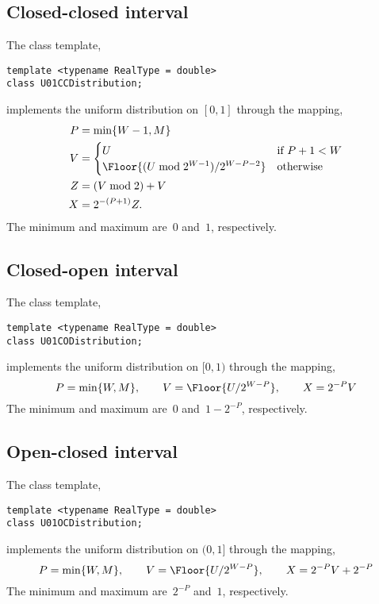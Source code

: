 \subsection{Closed-closed interval}
\label{sub:Closed-closed interval}

The class template,
\begin{verbatim}
template <typename RealType = double>
class U01CCDistribution;
\end{verbatim}
implements the uniform distribution on $[0, 1]$ through the mapping,
\begin{align*}
  P &= \min\{W - 1, M\} \\
  V &= \begin{cases}
    U &\text{if } P + 1 < W \\
    \Floor{(U \bmod 2^{W - 1}) / 2^{W - P -2}} &\text{otherwise}
  \end{cases} \\
  Z &= (V \bmod 2) + V \\
  X &= 2^{-(P + 1)} Z.
\end{align*}
The minimum and maximum are~$0$ and~$1$, respectively.

\subsection{Closed-open interval}
\label{sub:Closed-open interval}

The class template,
\begin{verbatim}
template <typename RealType = double>
class U01CODistribution;
\end{verbatim}
implements the uniform distribution on $[0, 1)$ through the mapping,
\begin{equation*}
  P = \min\{W, M\},\qquad
  V = \Floor{U / 2^{W - P}},\qquad
  X = 2^{-P} V
\end{equation*}
The minimum and maximum are~$0$ and~$1 - 2^{-P}$, respectively.

\subsection{Open-closed interval}
\label{sub:Open-closed interval}

The class template,
\begin{verbatim}
template <typename RealType = double>
class U01OCDistribution;
\end{verbatim}
implements the uniform distribution on $(0, 1]$ through the mapping,
\begin{equation*}
  P = \min\{W, M\},\qquad
  V = \Floor{U / 2^{W - P}},\qquad
  X = 2^{-P} V + 2^{-P}
\end{equation*}
The minimum and maximum are~$2^{-P}$ and~$1$, respectively.

